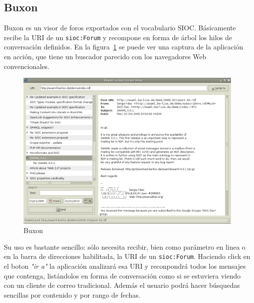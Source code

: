\subsection*{Buxon}

Buxon es un visor de foros exportados con el vocabulario SIOC. Básicamente 
recibe la URI de un \texttt{sioc:Forum} y recompone en forma de árbol los
hilos de conversación definidos. En la figura~\ref{fig:buxon} se puede ver
una captura de la aplicación en acción, que tiene un buscador parecido con 
los navegadores Web convencionales.

\begin{figure}[H]
	\centering
	\includegraphics[width=16cm]{images/screenshots/buxon.png}
	\caption{Buxon}
	\label{fig:buxon}
\end{figure}

Su uso es bastante sencillo: sólo necesita recibir, bien como parámetro en linea
o en la barra de direcciones habilitada, la URI de un \texttt{sioc:Forum}.
Haciendo click en el boton \textit{"ir a"} la aplicación analizará esa URI y reconpondrá
todos los mensajes que contenga, listándolos en forma de conversación como si se estuviera
viendo con un cliente de correo tradicional. Además el usuario podrá hacer búsquedas
sencillas por contenido y por rango de fechas.
